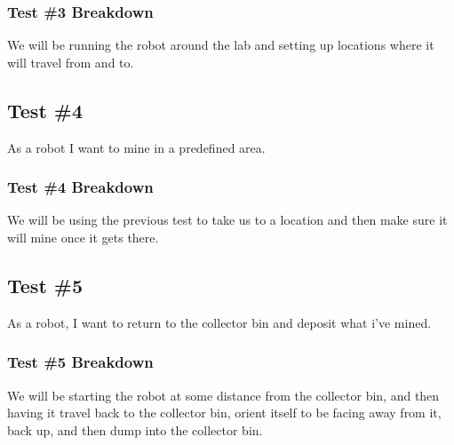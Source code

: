 \subsubsection{Test \#3 Breakdown}
We will be running the robot around the lab and setting up locations where it will travel from and to.

\subsection{Test \#4} 
As a robot I want to mine in a predefined area.
\subsubsection{Test \#4 Breakdown}
We will be using the previous test to take us to a location and then make sure it will mine once it gets there.


\subsection{Test \#5} 
As a robot, I want to return to the collector bin and deposit what i've mined.
\subsubsection{Test \#5 Breakdown}
We will be starting the robot at some distance from the collector bin, and then having it travel back to the collector bin, orient itself to be facing away from it, back up, and then dump into the collector bin.


